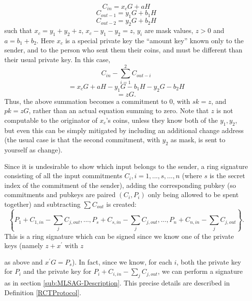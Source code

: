 \documentclass[12pt,oneside,english]{amsart}
\numberwithin{equation}{section}
\numberwithin{figure}{section}
\theoremstyle{plain}
\theoremstyle{plain}
\theoremstyle{remark}
\theoremstyle{plain}
\theoremstyle{remark}
\theoremstyle{remark}
\theoremstyle{plain}
\theoremstyle{definition}
\begin{document}
\[
C_{in}=x_{c}G+aH
\]
\[
C_{out-1}=y_{1}G+b_{1}H
\]
\[
C_{out-2}=y_{2}G+b_{2}H
\]
 such that $x_{c}=y_{1}+y_{2}+z$, $x_{c}-y_{1}-y_{2}=z$, $y_{i}$
are mask values, $z>0$ and $a=b_{1}+b_{2}.$ Here $x_{c}$ is a special
private key the ``amount key'' known only to the sender, and to
the person who sent them their coins, and must be different than their
usual private key. In this case, 
\[
C_{in}-\sum_{i=1}^{2}C_{out-i}
\]
\[
=x_{c}G+aH-y_{1}G-b_{1}H-y_{2}G-b_{2}H
\]
\[
=zG.
\]
Thus, the above summation becomes a commitment to $0$, with $sk=z$,
and $pk=zG$, rather than an actual equation summing to zero. Note
that $z$ is not computable to the originator of $x_{c}$'s coins,
unless they know both of the $y_{1},y_{2}$, but even this can be simply mitigated by including an additional change address (the usual case is that the second commitment, with $y_2$ as mask, is sent to yourself as change).  

Since it is undesirable to show which input belongs to the sender,
a ring signature consisting of all the input commitments $C_{i},i=1,...,s,...,n$
(where $s$ is the secret index of the commitment of the sender),
adding the corresponding pubkey (so commitments and pubkeys are paired
$\left(C_{i},P_{i}\right)$ only being allowed to be spent together)
and subtracting $\sum C_{out}$ is created: 
\[
\left\{ P_{1}+C_{1,in}-\sum_{j}C_{j,out},...,P_{s}+C_{s,in}-\sum_{j}C_{j,out},...,P_{n}+C_{n,in}-\sum_{j}C_{j,out}\right\} .
\]
 This is a ring signature which can be signed since we know one of
the private keys (namely $z+x^{\prime}$ with $z$ %
\begin{comment}
note you can't use $x_{s}=s$, or else once the output amount is unvelied,
the ring sig is caput - check this, since there are masks... 
\end{comment}
as above and $x^{\prime}G=P_{s}$). In fact, since we know, for each $i$, both the private key for $P_{i}$ and the private key for $P_{i}+C_{i,in}-\sum_{j}C_{j,out}$,
we can perform a signature as in section \ref{sub:MLSAG-Description}. This precise details are described in Definition \ref{RCTProtocol}.
\end{document}
